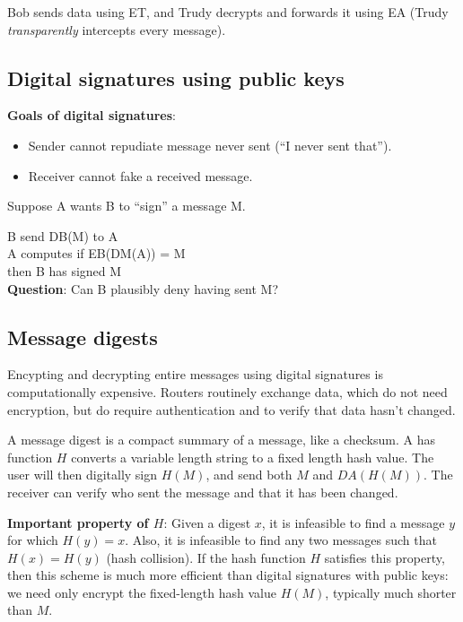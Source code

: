 \documentclass[twoside]{article}
\begin{document}
Bob sends data using ET, and Trudy decrypts and forwards it using EA (Trudy \textit{transparently} intercepts every message).

\subsection{Digital signatures using public keys}

\textbf{Goals of digital signatures}:

\begin{itemize}
\item Sender cannot repudiate message never sent (``I never sent that'').
\item Receiver cannot fake a received message.
\end{itemize}

Suppose A wants B to ``sign'' a message M.

B send DB(M) to A \\
A computes if EB(DM(A)) = M \\
\hspace*{1.0cm} then B has signed M \\

\textbf{Question}: Can B plausibly deny having sent M?

\subsection{Message digests}

Encypting and decrypting entire messages using digital signatures is computationally expensive. Routers routinely exchange data, which do not need encryption, but do require authentication and to verify that data hasn't changed.

A message digest is a compact summary of a message, like a checksum. A has function $H$ converts a variable length string to a fixed length hash value. The user will then digitally sign $H(M)$, and send both $M$ and $DA(H(M))$. The receiver can verify who sent the message and that it has been changed.

\textbf{Important property of $H$}: Given a digest $x$, it is infeasible to find a message $y$ for which $H(y) = x$. Also, it is infeasible to find any two messages such that $H(x) = H(y)$ (hash collision). If the hash function $H$ satisfies this property, then this scheme is much more efficient than digital signatures with public keys: we need only encrypt the fixed-length hash value $H(M)$, typically much shorter than $M$.
\end{document}
